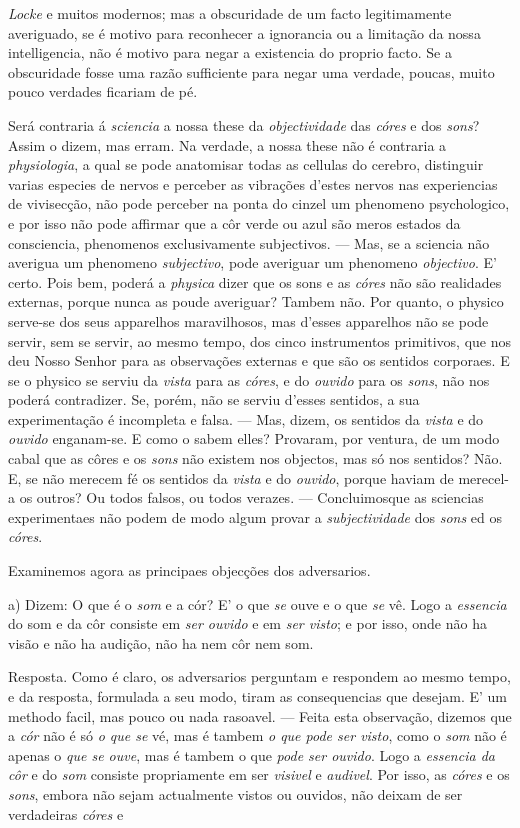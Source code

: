 \emph{Locke} e muitos modernos; mas a obscuridade de um facto legitimamente averiguado, se é motivo para reconhecer a ignorancia ou a limitação da nossa intelligencia, não é motivo para negar a existencia do proprio facto. Se a obscuridade fosse uma razão sufficiente para negar uma verdade, poucas, muito pouco verdades ficariam de pé.\par Será contraria á \emph{sciencia} a nossa these da \emph{objectividade} das \emph{córes} e dos \emph{sons}? Assim o dizem, mas erram. Na verdade, a nossa these não é contraria a \emph{physiologia}, a qual se pode anatomisar todas as cellulas do cerebro, distinguir varias especies de nervos e perceber as vibrações d'estes nervos nas experiencias de vivisecção, não pode perceber na ponta do cinzel um phenomeno psychologico, e por isso não pode affirmar que a côr verde ou azul são meros estados da consciencia, phenomenos exclusivamente subjectivos. --- Mas, se a sciencia não averigua um phenomeno \emph{subjectivo}, pode averiguar um phenomeno \emph{objectivo}. E' certo. Pois bem, poderá a \emph{physica} dizer que os sons e as \emph{córes} não são realidades externas, porque nunca as poude averiguar? Tambem não. Por quanto, o physico serve-se dos seus apparelhos maravilhosos, mas d'esses apparelhos não se pode servir, sem se servir, ao mesmo tempo, dos cinco instrumentos primitivos, que nos deu Nosso Senhor para as observações externas e que são os sentidos corporaes. E se o physico se serviu da \emph{vista} para as \emph{córes}, e do \emph{ouvido} para os \emph{sons}, não nos poderá contradizer. Se, porém, não se serviu d'esses sentidos, a sua experimentação é incompleta e falsa. --- Mas, dizem, os sentidos da \emph{vista} e do \emph{ouvido} enganam-se. E como o sabem elles? Provaram, por ventura, de um modo cabal que as côres e os \emph{sons} não existem nos objectos, mas só nos sentidos? Não. E, se não merecem fé os sentidos da \emph{vista} e do \emph{ouvido}, porque haviam de merecel-a os outros? Ou todos falsos, ou todos verazes. --- Concluimosque as sciencias experimentaes não podem de modo algum provar a \emph{subjectividade} dos \emph{sons} ed os \emph{córes}.\par Examinemos agora as principaes objecções dos adversarios.\par a) Dizem: O que é o \emph{som} e a cór? E' o que \emph{se} ouve e o que \emph{se} vê. Logo a \emph{essencia} do som e da côr consiste em \emph{ser ouvido} e em \emph{ser visto}; e por isso, onde não ha visão e não ha audição, não ha nem côr nem som.\par Resposta. Como é claro, os adversarios perguntam e respondem ao mesmo tempo, e da resposta, formulada a seu modo, tiram as consequencias que desejam. E' um methodo facil, mas pouco ou nada rasoavel. --- Feita esta observação, dizemos que a \emph{cór} não é só \emph{o que se} vé, mas é tambem \emph{o que pode ser visto}, como o \emph{som} não é apenas o \emph{que se ouve}, mas é tambem o que \emph{pode ser ouvido}. Logo a \emph{essencia da côr} e do \emph{som} consiste propriamente em ser \emph{visivel} e \emph{audivel}. Por isso, as \emph{córes} e os \emph{sons}, embora não sejam actualmente vistos ou ouvidos, não deixam de ser verdadeiras \emph{córes} e 